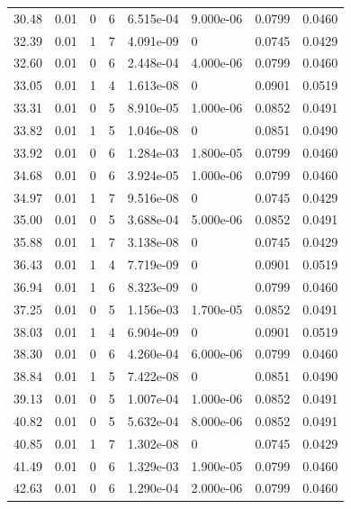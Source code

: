 \documentclass[preview]{standalone}
\begin{document}
{{{\begin{tabular}{L{1.2cm}C{1.2cm} C{0.3cm}C{0.5cm} C{1.4cm}C{1.4cm} C{1.4cm}C{1.4cm}}
  30.48  &  0.01  & 0     &  6 &  6.515e-04  & 9.000e-06  & 0.0799 &  0.0460   \\ 
  32.39  &  0.01  & 1     &  7 &  4.091e-09  & 0  & 0.0745 &  0.0429   \\ 
  32.60  &  0.01  & 0     &  6 &  2.448e-04  & 4.000e-06  & 0.0799 &  0.0460   \\ 
  33.05  &  0.01  & 1     &  4 &  1.613e-08  & 0  & 0.0901 &  0.0519   \\ 
  33.31  &  0.01  & 0     &  5 &  8.910e-05  & 1.000e-06  & 0.0852 &  0.0491   \\ 
  33.82  &  0.01  & 1     &  5 &  1.046e-08  & 0  & 0.0851 &  0.0490   \\ 
  33.92  &  0.01  & 0     &  6 &  1.284e-03  & 1.800e-05  & 0.0799 &  0.0460   \\ 
  34.68  &  0.01  & 0     &  6 &  3.924e-05  & 1.000e-06  & 0.0799 &  0.0460   \\ 
  34.97  &  0.01  & 1     &  7 &  9.516e-08  & 0  & 0.0745 &  0.0429   \\ 
  35.00  &  0.01  & 0     &  5 &  3.688e-04  & 5.000e-06  & 0.0852 &  0.0491   \\ 
  35.88  &  0.01  & 1     &  7 &  3.138e-08  & 0  & 0.0745 &  0.0429   \\ 
  36.43  &  0.01  & 1     &  4 &  7.719e-09  & 0  & 0.0901 &  0.0519   \\ 
  36.94  &  0.01  & 1     &  6 &  8.323e-09  & 0  & 0.0799 &  0.0460   \\ 
  37.25  &  0.01  & 0     &  5 &  1.156e-03  & 1.700e-05  & 0.0852 &  0.0491   \\ 
  38.03  &  0.01  & 1     &  4 &  6.904e-09  & 0  & 0.0901 &  0.0519   \\ 
  38.30  &  0.01  & 0     &  6 &  4.260e-04  & 6.000e-06  & 0.0799 &  0.0460   \\ 
  38.84  &  0.01  & 1     &  5 &  7.422e-08  & 0  & 0.0851 &  0.0490   \\ 
  39.13  &  0.01  & 0     &  5 &  1.007e-04  & 1.000e-06  & 0.0852 &  0.0491   \\ 
  40.82  &  0.01  & 0     &  5 &  5.632e-04  & 8.000e-06  & 0.0852 &  0.0491   \\ 
  40.85  &  0.01  & 1     &  7 &  1.302e-08  & 0  & 0.0745 &  0.0429   \\ 
  41.49  &  0.01  & 0     &  6 &  1.329e-03  & 1.900e-05  & 0.0799 &  0.0460   \\ 
  42.63  &  0.01  & 0     &  6 &  1.290e-04  & 2.000e-06  & 0.0799 &  0.0460   \\ 

\end{tabular}}}}
\end{document}
